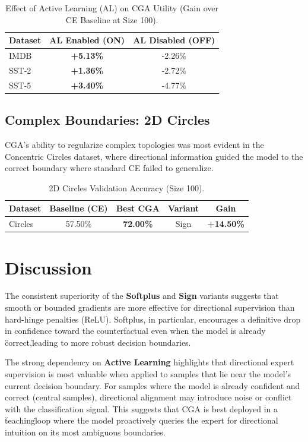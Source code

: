 \documentclass[sigconf,anonymous]{aamas}
\begin{document}
\begin{table}[h]
\centering
\caption{Effect of Active Learning (AL) on CGA Utility (Gain over CE Baseline at Size 100).}
\label{tab:al_synergy}
\begin{tabular}{@{}lcc@{}}
\toprule
\textbf{Dataset} & \textbf{AL Enabled (ON)} & \textbf{AL Disabled (OFF)} \\ \midrule
IMDB & \textbf{+5.13\%} & -2.26\% \\
SST-2 & \textbf{+1.36\%} & -2.72\% \\
SST-5 & \textbf{+3.40\%} & -4.77\% \\ \bottomrule
\end{tabular}
\end{table}

\subsection{Complex Boundaries: 2D Circles}
CGA's ability to regularize complex topologies was most evident in the Concentric Circles dataset, where directional information guided the model to the correct boundary where standard CE failed to generalize.

\begin{table}[h]
\centering
\caption{2D Circles Validation Accuracy (Size 100).}
\label{tab:2d_circles}
\begin{tabular}{@{}lcccc@{}}
\toprule
\textbf{Dataset} & \textbf{Baseline (CE)} & \textbf{Best CGA} & \textbf{Variant} & \textbf{Gain} \\ \midrule
Circles & 57.50\% & \textbf{72.00\%} & Sign & \textbf{+14.50\%} \\ \bottomrule
\end{tabular}
\end{table}

\section{Discussion}
The consistent superiority of the \textbf{Softplus} and \textbf{Sign} variants suggests that smooth or bounded gradients are more effective for directional supervision than hard-hinge penalties (ReLU). Softplus, in particular, encourages a definitive drop in confidence toward the counterfactual even when the model is already \"correct,\" leading to more robust decision boundaries.

The strong dependency on \textbf{Active Learning} highlights that directional expert supervision is most valuable when applied to samples that lie near the model's current decision boundary. For samples where the model is already confident and correct (central samples), directional alignment may introduce noise or conflict with the classification signal. This suggests that CGA is best deployed in a \"teaching\" loop where the model proactively queries the expert for directional intuition on its most ambiguous boundaries.
\end{document}
